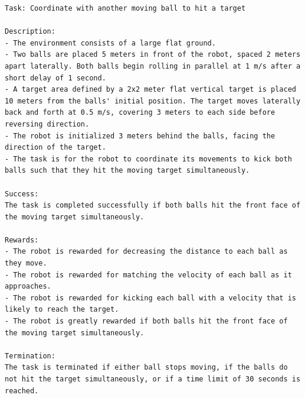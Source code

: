 \begin{lstlisting}[language={}]
Task: Coordinate with another moving ball to hit a target

Description:
- The environment consists of a large flat ground.
- Two balls are placed 5 meters in front of the robot, spaced 2 meters apart laterally. Both balls begin rolling in parallel at 1 m/s after a short delay of 1 second.
- A target area defined by a 2x2 meter flat vertical target is placed 10 meters from the balls' initial position. The target moves laterally back and forth at 0.5 m/s, covering 3 meters to each side before reversing direction.
- The robot is initialized 3 meters behind the balls, facing the direction of the target.
- The task is for the robot to coordinate its movements to kick both balls such that they hit the moving target simultaneously.

Success:
The task is completed successfully if both balls hit the front face of the moving target simultaneously.

Rewards:
- The robot is rewarded for decreasing the distance to each ball as they move.
- The robot is rewarded for matching the velocity of each ball as it approaches.
- The robot is rewarded for kicking each ball with a velocity that is likely to reach the target.
- The robot is greatly rewarded if both balls hit the front face of the moving target simultaneously.

Termination:
The task is terminated if either ball stops moving, if the balls do not hit the target simultaneously, or if a time limit of 30 seconds is reached.
\end{lstlisting}
